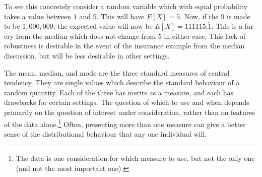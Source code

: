 \documentclass[
  letterpaper,
  DIV=11,
  numbers=noendperiod]{scrreprt}
\theoremstyle{definition}
\theoremstyle{definition}
\theoremstyle{definition}
\theoremstyle{remark}
\begin{document}
To see this concretely consider a random variable which with equal
probability takes a value between \(1\) and \(9\). This will have
\(E[X] = 5\). Now, if the \(9\) is made to be \(1,000,000\), the
expected value will now be \(E[X] = 111115.\dot1\). This is a far cry
from the median which does not change from \(5\) in either case. This
lack of robustness is desirable in the event of the insurance example
from the median discussion, but will be less desirable in other
settings.

The mean, median, and mode are the three standard measures of central
tendency. They are single values which describe the standard behaviour
of a random quantity. Each of the three has merits as a measure, and
each has drawbacks for certain settings. The question of which to use
and when depends primarily on the question of interest under
consideration, rather than on features of the data alone.\footnote{The
  data is one consideration for which measure to use, but not the only
  one (and not the most important one).} Often, presenting more than one
measure can give a better sense of the distributional behaviour that any
one individual will.
\end{document}
